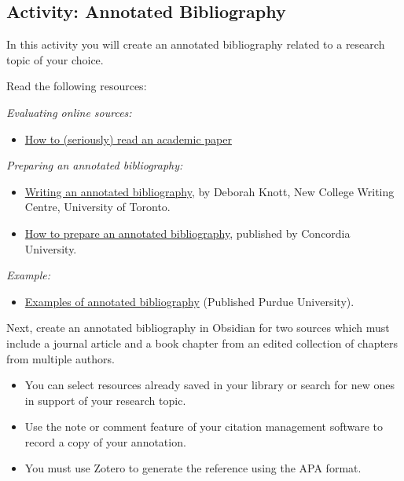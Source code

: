 \documentclass[
]{book}
\providecommand{\tightlist}{%
  \setlength{\itemsep}{0pt}\setlength{\parskip}{0pt}}
\theoremstyle{definition}
\theoremstyle{definition}
\theoremstyle{definition}
\theoremstyle{definition}
\theoremstyle{remark}
\begin{document}
\hypertarget{activity-annotated-bibliography}{%
\subsection*{Activity: Annotated Bibliography}\label{activity-annotated-bibliography}}

\begin{reflect}
In this activity you will create an annotated bibliography related to a research topic of your choice.

Read the following resources:

\emph{Evaluating online sources:}

\begin{itemize}
\tightlist
\item
  \href{https://www.science.org/content/article/how-seriously-read-scientific-paper}{How to (seriously) read an academic paper}
\end{itemize}

\emph{Preparing an annotated bibliography:}

\begin{itemize}
\tightlist
\item
  \href{https://advice.writing.utoronto.ca/types-of-writing/annotated-bibliography/}{Writing an annotated bibliography}, by Deborah Knott, New College Writing Centre, University of Toronto.
\item
  \href{https://library.concordia.ca/help/writing/annotated-bibliography.php}{How to prepare an annotated bibliography}, published by Concordia University.
\end{itemize}

\emph{Example:}

\begin{itemize}
\tightlist
\item
  \href{https://owl.purdue.edu/owl/general_writing/common_writing_assignments/annotated_bibliographies/annotated_bibliography_samples.html}{Examples of annotated bibliography} (Published Purdue University).
\end{itemize}

Next, create an annotated bibliography in Obsidian for two sources which must include a journal article and a book chapter from an edited collection of chapters from multiple authors.

\begin{itemize}
\tightlist
\item
  You can select resources already saved in your library or search for new ones in support of your research topic.
\item
  Use the note or comment feature of your citation management software to record a copy of your annotation.
\item
  You must use Zotero to generate the reference using the APA format.
\end{itemize}
\end{reflect}
\end{document}
